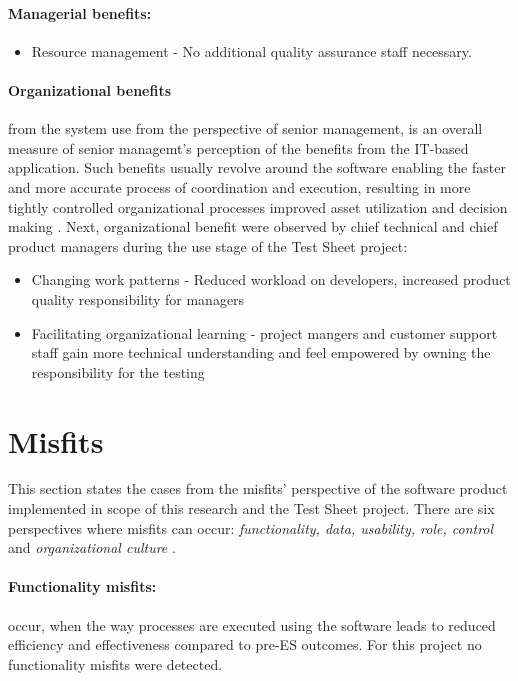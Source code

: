 \paragraph{Managerial benefits:}
\begin{itemize}
	\item Resource management - No additional quality assurance staff necessary.
\end{itemize}


\paragraph{Organizational benefits} from the system use from the perspective of senior management, is an overall measure of senior managemt's perception of the benefits from the IT-based application. Such benefits usually revolve around the software enabling the faster and more accurate process of coordination and execution, resulting in more tightly controlled organizational processes improved asset utilization and decision making \cite{MES11}.
Next, organizational benefit were observed by chief technical and chief product managers during the use stage of the Test Sheet project:

\begin{itemize}
	\item Changing work patterns - Reduced workload on developers, increased product quality responsibility for managers
	\item Facilitating organizational learning - project mangers and customer support staff gain more technical understanding and feel empowered by owning the responsibility for the testing
\end{itemize}



\section{Misfits}
This section states the cases from the misfits' perspective of the software product implemented in scope of this research and the Test Sheet project. There are six perspectives where misfits can occur: \textit{functionality, data, usability, role, control} and \textit{organizational culture} \cite{MES10}.

\paragraph{Functionality misfits:} occur, when the way processes are executed using the software leads to reduced efficiency and effectiveness compared to pre-ES outcomes. For this project no functionality misfits were detected.

